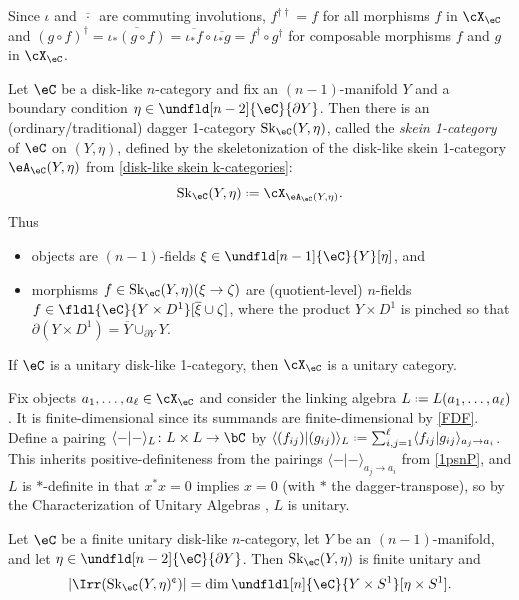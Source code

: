 \documentclass[12pt,reqno]{amsart}
\newcommand{\Sk}{\mathrm{Sk}}
\newcommand{\A}{\eA}
\newcommand{\C}{\eC}
\newcommand{\fcj}[1]{\overline{#1}}
\newcommand{\orev}{\overline}
\newcommand{\bkt}[2]{\langle #1|#2 \rangle}
\newcommand{\defn}[1]{\emph{#1}}
\newcommand{\cent}{\textup{\textcent}}
\DeclareRobustCommand{\coloneq}{\mathrel{\vcenter{\baselineskip0.5ex\lineskiplimit0pt\hbox{\scriptsize{\upshape.}}\hbox{\scriptsize{\upshape.}}}}=}
\begin{document}
\begin{pf}
  Since $\iota$ and $\fcj{\,\cdot\,}$ are commuting involutions, $f^{\dag\dag}=f$ for all morphisms $f$ in $\cX_\C$ and $(g\circ f)^{\dag}=\fcj{\iota_*(g\circ f)}=\fcj{\iota_*f}\circ \fcj{\iota_*g}=f^{\dag}\circ g^{\dag}$ for composable morphisms $f$ and $g$ in $\cX_\C$.
\end{pf}

\begin{example}
\label{skein 1-category}
Let $\C$ be a disk-like $n$-category and fix an $(n-1)$-manifold $Y$ and a boundary condition $\eta\in\undfld[n-2]{\C}{\partial Y}$. Then there is an (ordinary/traditional) dagger 1-category $\Sk_\C(Y,\eta)$, called the \defn{skein 1-category} of $\C$ on $(Y,\eta)$, defined by the skeletonization of the disk-like skein 1-category $\A_\C(Y,\eta)$ from \cref{disk-like skein k-categories}:
\[
\Sk_\C(Y,\eta)\coloneq\cX_{\A_\C(Y,\eta)}.
\]
Thus
\begin{itemize}
    \item objects are $(n-1)$-fields $\xi\in\undfld[n-1]{\C}{Y}[\eta]$, and
    \item morphisms $f\in\Sk_\C(Y,\eta)(\xi\to\zeta)$ are (quotient-level) $n$-fields $f\in\fldl{\C}{Y\times D^1}[\fcj{\xi}\cup\zeta]$, where the product $Y\times D^1$ is pinched so that $\partial (Y\times D^1)=\orev{Y}\cup_{\partial Y}Y$.
\end{itemize}
\end{example}

\begin{lemma}[Unitarity of $\cX_\eC$]
  \label{unitarity of cX}
  If $\eC$ is a unitary disk-like 1-category, then $\cX_\eC$ is a unitary category.
\end{lemma}

\begin{pf}
  Fix objects $a_1,\dots,a_\ell\in \cX_\eC$ and consider the linking algebra $L\coloneq L(a_1,\dots,a_\ell)$. It is finite-dimensional since its summands are finite-dimensional by \ref{FDF}. Define a pairing $\bkt{-}{-}_{L}\colon L\times L\to\bC$ by $\bkt{(f_{ij})}{(g_{ij})}_{L}\coloneq \sum_{i,j=1}^\ell\bkt{f_{ij}}{g_{ij}}_{a_j\to a_i}$. This inherits positive-definiteness from the pairings $\bkt{-}{-}_{a_j\to a_i}$ from \ref{1psnP},
  and $L$ is $*$-definite in that $x^*x=0$ implies $x=0$ (with $*$ the dagger-transpose),
  so by the Characterization of Unitary Algebras \cite[Thm. I.2.4.4]{UQSL}, $L$ is unitary.
\end{pf}

\begin{proposition}
\label{lem:closing-up}
Let $\C$ be a finite unitary disk-like $n$-category, let $Y$ be an $(n-1)$-manifold, and let $\eta\in\undfld[n-2]{\C}{\partial Y}$.
Then $\Sk_\C(Y,\eta)$ is finite unitary and
\begin{equation}
\label{dimct}
|\Irr(\Sk_\C(Y,\eta)^\cent)|=\dim\undfldl[n]{\C}{Y\times S^1}[\eta\times S^1].
\end{equation}
\end{proposition}
\end{document}

